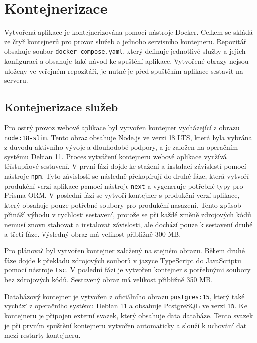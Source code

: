 \section{Kontejnerizace}

Vytvořená aplikace je kontejnerizována pomocí nástroje Docker. Celkem se skládá ze čtyř kontejnerů pro provoz služeb a jednoho servisního kontejneru.
Repozitář obsahuje soubor \texttt{docker-compose.yaml}, který definuje jednotlivé služby a jejich konfiguraci a obsahuje také návod ke spuštění aplikace.
Vytvořené obrazy nejsou uloženy ve veřejném repozitáři, je nutné je před spuštěním aplikace sestavit na serveru.

\subsection{Kontejnerizace služeb}

Pro ostrý provoz webové aplikace byl vytvořen kontejner vycházející z obrazu \texttt{node:18-slim}. Tento obraz obsahuje 
Node.js ve verzi 18 LTS, která byla vybrána z důvodu aktivního vývoje a dlouhodobé podpory, a je založen na operačním systému Debian 11.
Proces vytváření kontejneru webové aplikace využívá třístupňové sestavení. V první fázi dojde ke stažení a instalaci závislostí pomocí nástroje \texttt{npm}.
Tyto závislosti se následně překopírují do druhé fáze, která vytvoří produkční verzi aplikace pomocí nástroje \texttt{next} a vygeneruje potřebné typy pro Prisma ORM.
V poslední fázi se vytvoří kontejner s produkční verzí aplikace, který obsahuje pouze potřebné soubory pro produkční nasazení.
Tento způsob přináší výhodu v rychlosti sestavení, protože se při každé změně
zdrojových kódů nemusí znovu stahovat a instalovat závislosti, ale dochází pouze k sestavení druhé a třetí fáze. Výsledný obraz má velikost přibližně 300 MB.

Pro plánovač byl vytvořen kontejner založený na stejném obrazu. Během druhé fáze dojde k překladu zdrojových souborů v jazyce TypeScript do JavaScriptu pomocí nástroje \texttt{tsc}.
V poslední fázi je vytvořen kontejner s potřebnými soubory bez zdrojových kódů. Sestavený obraz má velikost přibližně 350 MB. 

Databázový kontejner je vytvořen z oficiálního obrazu \texttt{postgres:15}, který také vychází z operačního systému Debian 11 a obsahuje PostgreSQL ve verzi 15.
Ke kontejneru je připojen externí svazek, který obsahuje data databáze. Tento svazek je při prvním spuštění kontejneru vytvořen automaticky a slouží k uchování dat mezi restarty kontejneru.

